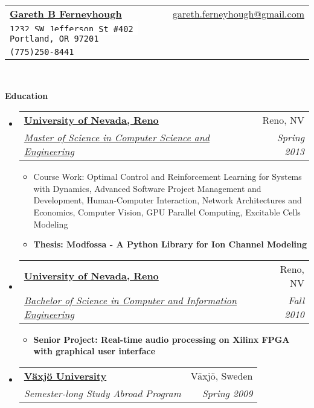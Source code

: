 \documentclass[letterpaper,11pt]{article}
\makeatletter
\newcommand{\resitem}[1]{\item #1 \vspace{-2pt}}
\newcommand{\resheading}[1]{{\large \colorbox{mygrey}{\begin{minipage}{\textwidth}{\textbf{#1 \vphantom{p\^{E}}}}\end{minipage}}}}
\newcommand{\ressubheading}[4]{
\begin{tabular*}{6.5in}{l@{\extracolsep{\fill}}r}
		\textbf{#1} & #2 \\
		\textit{#3} & \textit{#4} \\
\end{tabular*}\vspace{-6pt}}
\makeatother
\begin{document}
\newcommand{\mywebheader}{
\begin{tabular*}{7in}{l@{\extracolsep{\fill}}r}
	\textbf{\href{http://linkedin.com/in/gferneyhough}{\LARGE Gareth B Ferneyhough}} & \href{mailto:gareth.ferneyhough@gmail.com}{gareth.ferneyhough@gmail.com}\\
	{\footnotesize \texttt{\colorbox{white}{1232 SW Jefferson St \#402 Portland, OR 97201}}} &  \\
	{\footnotesize \texttt{\colorbox{white}{(775)250-8441}}}
	\end{tabular*}
\\
\vspace{0.1in}}

\mywebheader

\resheading{Education}
	\begin{itemize}
		\item
			\ressubheading{\href{http://www.unr.edu/}{University of Nevada, Reno}}{Reno, NV}{\href{http://www.cse.unr.edu/academics/graduate/cesms.html}{Master of Science in Computer Science and Engineering}}{Spring 2013}
				{ \footnotesize
				\begin{itemize}
				  \resitem{Course Work: Optimal Control and Reinforcement Learning for Systems with Dynamics, Advanced Software Project Management and Development, Human-Computer Interaction, Network Architectures and Economics, Computer Vision, GPU Parallel Computing, Excitable Cells Modeling}
				  \resitem{\textbf{Thesis: Modfossa - A Python Library for Ion Channel Modeling}}
				\end{itemize}
				}
		\item
			\ressubheading{\href{http://www.unr.edu/}{University of Nevada, Reno}}{Reno, NV}{\href{http://www.cse.unr.edu/academics/undergraduate/ciebs.html}{Bachelor of Science in Computer and Information Engineering}}{Fall 2010}
				{ \footnotesize
				\begin{itemize}
				  \resitem{\textbf{Senior Project: Real-time audio processing on Xilinx FPGA with graphical user interface}}
				\end{itemize}
				}
		\item
			\ressubheading{\href{http://lnu.se/?l=en}{V\"{a}xj\"{o} University}}{V\"{a}xj\"{o}, Sweden}{Semester-long Study Abroad Program}{Spring 2009}
	\end{itemize} %
\end{document}
